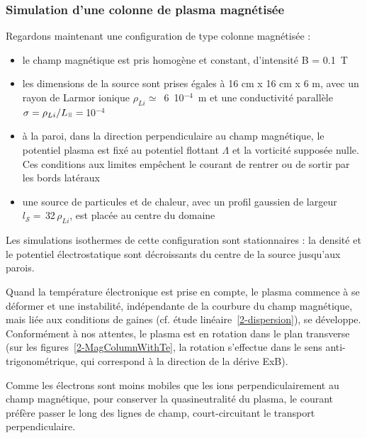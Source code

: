 \begin{refsection}
\subsubsection{Simulation d'une colonne de plasma magnétisée}
Regardons maintenant une configuration de type colonne magnétisée : 

\begin{itemize}
  \item le champ magnétique est pris homogène et constant, d'intensité B = 0.1~T
  \item les dimensions de la source sont prises égales à 16 cm x
  16 cm x 6 m, avec un rayon
  de Larmor ionique $\rho_{Li}\simeq$~6~10$^{-4}$~m et une conductivité
  parallèle $\sigma=\rho_{Li}/L_\para=\,$10$^{-4}$
  \item à la paroi, dans la direction perpendiculaire au champ magnétique, le
  potentiel plasma est fixé au potentiel flottant $\Lambda$ et la vorticité
  supposée nulle. Ces conditions aux limites empêchent le courant de rentrer ou
  de sortir par les bords latéraux
  \item une source de particules et de chaleur, avec un profil gaussien de
  largeur $l_{\mathcal S}=\,$32$\,\rho_{Li}$, est placée au centre du domaine
\end{itemize}

Les simulations isothermes de cette configuration sont stationnaires : la
densité et le potentiel électrostatique sont décroissants du centre de la
source jusqu'aux parois. 

Quand la température électronique est prise en compte,
le plasma commence à se déformer et une instabilité, indépendante de la
courbure du champ magnétique, mais liée aux conditions de gaines (cf. étude
linéaire~\eqref{2-dispersion}), se développe.
Conformément à nos attentes, le plasma est en rotation dans le plan transverse (sur les
figures~\ref{2-MagColumnWithTe}, la rotation s'effectue dans le sens
anti-trigonométrique, qui correspond à la direction de la dérive ExB).


Comme les électrons sont moins mobiles que les ions perpendiculairement au champ
magnétique, pour conserver
la quasineutralité du plasma, le courant préfère passer le long des lignes de
champ, court-circuitant le transport perpendiculaire.


\end{refsection}
